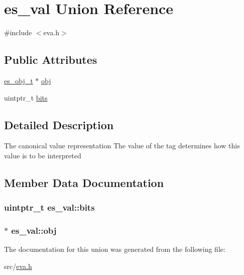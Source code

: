 \hypertarget{uniones__val}{\section{es\-\_\-val Union Reference}
\label{uniones__val}
}


{\ttfamily \#include $<$eva.\-h$>$}

\subsection*{Public Attributes}
\begin{DoxyCompactItemize}
\item 
\hyperlink{eva_8h_a3370a89a85f5ff467ca5e7dba47e63bc}{es\-\_\-obj\-\_\-t} $\ast$ \hyperlink{uniones__val_a1dfa3da74b4973f06cbb64f1a88969fc}{obj}
\item 
uintptr\-\_\-t \hyperlink{uniones__val_a37232e7ef088946e4425079eb40b1d46}{bits}
\end{DoxyCompactItemize}


\subsection{Detailed Description}
The canonical value representation The value of the tag determines how this value is to be interpreted 

\subsection{Member Data Documentation}
\hypertarget{uniones__val_a37232e7ef088946e4425079eb40b1d46}{
\subsubsection[{bits}]{\setlength{\rightskip}{0pt plus 5cm}uintptr\-\_\-t es\-\_\-val\-::bits}}\label{uniones__val_a37232e7ef088946e4425079eb40b1d46}
\hypertarget{uniones__val_a1dfa3da74b4973f06cbb64f1a88969fc}{
\subsubsection[{obj}]{$\ast$ es\-\_\-val\-::obj}}\label{uniones__val_a1dfa3da74b4973f06cbb64f1a88969fc}


The documentation for this union was generated from the following file\-:\begin{DoxyCompactItemize}
\item 
src/\hyperlink{eva_8h}{eva.\-h}\end{DoxyCompactItemize}
